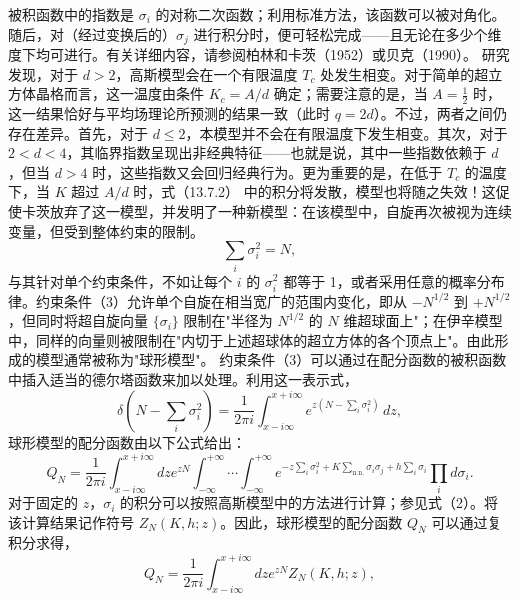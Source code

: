 被积函数中的指数是 \(\sigma_{i}\) 的对称二次函数；利用标准方法，该函数可以被对角化。随后，对（经过变换后的）\(\sigma_{j}\) 进行积分时，便可轻松完成——且无论在多少个维度下均可进行。有关详细内容，请参阅柏林和卡茨（1952）或贝克（1990）。
研究发现，对于 \(d>2\)，高斯模型会在一个有限温度 \(T_{c}\) 处发生相变。对于简单的超立方体晶格而言，这一温度由条件 \(K_{c}=A/d\) 确定；需要注意的是，当 \(A=\frac{1}{2}\) 时，这一结果恰好与平均场理论所预测的结果一致（此时 \(q=2d\)）。不过，两者之间仍存在差异。首先，对于 \(d\leq2\)，本模型并不会在有限温度下发生相变。其次，对于 \(2<d<4\)，其临界指数呈现出非经典特征——也就是说，其中一些指数依赖于 \(d\)，但当 \(d>4\) 时，这些指数又会回归经典行为。更为重要的是，在低于 \(T_{c}\) 的温度下，当 \(K\) 超过 \(A/d\) 时，式（13.7.2） 中的积分将发散，模型也将随之失效！这促使卡茨放弃了这一模型，并发明了一种新模型：在该模型中，自旋再次被视为连续变量，但受到整体约束的限制。
\begin{equation}\tag{13.4.32}\label{eq:13.4.32}
\sum _ { i } \sigma _ { i } ^{2} = N ,
\end{equation}
与其针对单个约束条件，不如让每个 \(i\) 的 \(\sigma_{i}^{2}\) 都等于 1，或者采用任意的概率分布律。约束条件（3）允许单个自旋在相当宽广的范围内变化，即从 \(-N^{1/2}\) 到 \(+N^{1/2}\)，但同时将超自旋向量 \(\{\sigma_{i}\}\) 限制在"半径为 \(N^{1/2}\) 的 \(N\) 维超球面上"；在伊辛模型中，同样的向量则被限制在"内切于上述超球体的超立方体的各个顶点上"。由此形成的模型通常被称为"球形模型"。
约束条件（3）可以通过在配分函数的被积函数中插入适当的德尔塔函数来加以处理。利用这一表示式，
\begin{equation}\tag{13.4.33}\label{eq:13.4.33}
\delta \left( N - \sum _ { i } \sigma _ { i } ^{2} \right) = \frac { 1 } { 2 \pi i } \int _ { x - i \infty } ^{x + i \infty} e ^{z ( N - \sum _ { i} \sigma _ { i } ^{2} ) } \, d z ,
\end{equation}
球形模型的配分函数由以下公式给出：
\begin{equation}\tag{13.4.34}\label{eq:13.4.34}
Q _ { N } = \frac { 1 } { 2 \pi i } \int _ { x - i \infty } ^{x + i \infty} d z e ^{z N} \int _ { - \infty } ^{+ \infty} \cdots \int _ { - \infty } ^{+ \infty} e ^{- z \sum _ { i} \sigma _ { i } ^{2} + K \sum _ { \mathrm { n . n . } } \sigma _ { i } \sigma _ { j } + h \sum _ { i } \sigma _ { i } } \prod _ { i } d \sigma _ { i } .
\end{equation}
对于固定的 \(z\)，\(\sigma_{i}\) 的积分可以按照高斯模型中的方法进行计算；参见式（2）。将该计算结果记作符号 \(Z_{N}(K,h;z)\)。因此，球形模型的配分函数 \(Q_{N}\) 可以通过复积分求得，
\begin{equation}\tag{13.4.35}\label{eq:13.4.35}
Q _ { N } = \frac { 1 } { 2 \pi i } \int _ { x - i \infty } ^{x + i \infty} d z e ^{z N} Z _ { N } ( K , h ; z ) ,
\end{equation}
